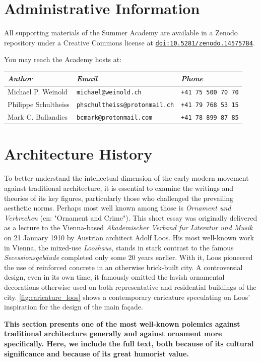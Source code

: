 \documentclass[a4paper]{article}
\begin{document}
\section*{\centering Administrative Information}

All supporting materials of the Summer Academy are available in a Zenodo repository under a Creative Commons license at \href{https://doi.org/10.5281/zenodo.14575784}{\texttt{doi:10.5281/zenodo.14575784}}.

You may reach the Academy hosts at:

\begin{NiceTabularX}{\textwidth}{llX}
\textit{Author} & \textit{Email} & \textit{Phone} \\
\hline
Michael P. Weinold & \texttt{michael@weinold.ch} & \texttt{+41 75 500 70 70} \\
Philippe Schultheiss & \texttt{phschultheiss@protonmail.ch} & \texttt{+41 79 768 53 15} \\
Mark C. Ballandies & \texttt{bcmark@protonmail.com} & \texttt{+41 78 899 87 85}
\end{NiceTabularX}

\tableofcontents

\clearpage
\section{Architecture History}

\begin{mdframed}[linewidth=1pt, roundcorner=5pt, innerleftmargin=10pt, innerrightmargin=10pt, innertopmargin=10pt, innerbottommargin=10pt, linecolor=black, backgroundcolor=white, userdefinedwidth=\textwidth]
    To better understand the intellectual dimension of the early modern movement against traditional architecture, it is essential to examine the writings and theories of its key figures, particularly those who challenged the prevailing aesthetic norms. Perhaps most well known among those is \textit{Ornament und Verbrechen} \cite{loos_ornament_1908} (en: "Ornament and Crime"). This short essay was originally delivered as a lecture to the Vienna-based \textit{Akademischer Verband fur Literatur und Musik} on 21 January 1910 by Austrian architect Adolf Loos. His most well-known work in Vienna, the mixed-use \textit{Looshaus}, stands in stark contrast to the famous \textit{Secessionsgebäude} completed only some 20 years earlier. With it, Loos pioneered the use of reinforced concrete in an otherwise brick-built city. A controversial design, even in its own time, it famously omitted the lavish ornamental decorations otherwise used on both representative and residential buildings of the city. \cref{fig:caricature_loos} shows a contemporary caricature speculating on Loos' inspiration for the design of the main façade.
    
    \textbf{This section presents one of the most well-known polemics against traditional architecture generally and against ornament more specifically. Here, we include the full text, both because of its cultural significance and because of its great humorist value.}
    \label{fig:caricature_loos}
\end{mdframed}
\end{document}
